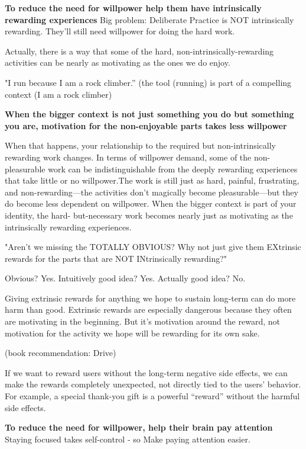 \textbf{To reduce the need for willpower help them have intrinsically rewarding experiences}
Big problem: Deliberate Practice is NOT intrinsically rewarding. They’ll still need willpower for doing the hard work.

Actually, there is a way that some of the hard, non-intrinsically-rewarding activities can be nearly as motivating as the ones we do enjoy.

"I run because I am a rock climber.” (the tool (running) is part of a compelling context (I am a rock climber)

\textbf{When the bigger context is not just something you do but something you are, motivation for the non-enjoyable parts takes less willpower}

When that happens, your relationship to the required
but non-intrinsically rewarding work changes. In terms of willpower demand, some of the non-pleasurable work can be indistinguishable from the deeply rewarding experiences that take little or no willpower.The work is still just as hard, painful, frustrating, and non-rewarding—the activities don’t magically become pleasurable—but they do become less dependent on willpower.
When the bigger context is part of your identity, the hard- but-necessary work becomes nearly just as motivating as the intrinsically rewarding experiences.

"Aren’t we missing the TOTALLY OBVIOUS? Why not just give them EXtrinsic rewards for the parts that are NOT INtrinsically rewarding?"

Obvious? Yes.
Intuitively good idea? Yes.
Actually good idea? No.

Giving extrinsic rewards for anything we
hope to sustain long-term can do more harm than good. Extrinsic rewards are especially dangerous because they often are motivating in the beginning. But it’s motivation around the reward, not motivation for the activity we hope will be rewarding for its own sake.

(book recommendation: Drive)

If we want to reward users without the long-term negative side effects, we can make the rewards completely unexpected, not directly tied to the users’ behavior. For example, a special thank-you gift is a powerful “reward” without the harmful side effects.

\textbf{To reduce the need for willpower, help their brain pay attention}
Staying focused takes self-control - so Make paying attention easier.

